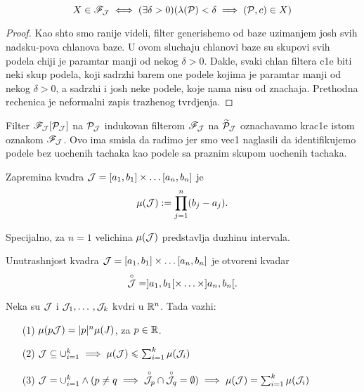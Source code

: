 \documentclass[../main.tex]{subfiles}
\begin{document}
    \begin{pr}
    	\[X \in \mathscr{F}_{\mathcal{J}} \iff (\exists \delta > 0) (\lambda(\mathcal{P})<\delta \implies (\mathcal{P},c)\in X)\]
    \end{pr}

    \begin{proof}
    	Kao shto smo ranije videli, filter generishemo od baze uzimanjem josh svih nadsku-pova chlanova baze. U ovom sluchaju chlanovi baze su skupovi svih podela
	chiji je paramtar manji od nekog $\delta>0$. Dakle, svaki chlan filtera c1e biti neki skup podela, koji sadrzhi barem one podele kojima je paramtar
	manji od nekog $\delta>0$, a sadrzhi i josh neke podele, koje nama nisu od znachaja. Prethodna rechenica je neformalni zapis trazhenog tvrdjenja.
    \end{proof}

    Filter $\mathscr{F}_{\mathcal{J}}[\mathcal{P}_{\mathcal{J}}]$ na $\mathcal{P}_{\mathcal{J}}$ indukovan filterom $\mathscr{F}_{\mathcal{J}}$ na $\widetilde{\mathcal{P}}_{\mathcal{J}}$ oznachavamo krac1e istom oznakom $\mathscr{F}_{\mathcal{J}}$. Ovo ima smisla da radimo jer
    smo vec1 naglasili da identifikujemo podele bez uochenih tachaka kao podele sa praznim skupom uochenih tachaka.

    \begin{de}
    	Zapremina kvadra $\mathcal{J}=[a_1,b_1]\times \dotso [a_n,b_n]$ je \[\mu(\mathcal{J}):=\prod_{j=1}^n(b_j-a_j).\]
    \end{de}

    Specijalno, za $n=1$ velichina $\mu(\mathcal{J})$ predstavlja duzhinu intervala.

    \begin{de}
    	Unutrashnjost kvadra $\mathcal{J} = [a_1,b_1]\times \dotso [a_n,b_n]$ je otvoreni kvadar $$\overset{\circ}{\mathcal{J}} = ]a_1,b_1[\times \dotso \times ]a_n,b_n[.$$
    \end{de}

    \begin{tvr}
    	Neka su $\mathcal{J}$ i $\mathcal{J}_1,\dotso,\mathcal{J}_k$ kvdri u $\mathbb{R}^n$. Tada vazhi: 
	\begin{itemize}
	    \item[(1)] $\mu(p\mathcal{J})=|p|^n\mu(J)$, za $p \in \mathbb{R}$. 
	    \item[(2)] $\mathcal{J} \subseteq \cup_{i=1}^k \implies \mu(\mathcal{J}) \leqslant \sum_{i=1}^k \mu(\mathcal{J}_i)$
	    \item[(3)] $\mathcal{J}=\cup_{i=1}^k \land ( p \neq q \implies \overset{\circ}{\mathcal{J}_p} \cap \overset{\circ}{\mathcal{J}_q} = \emptyset) \implies \mu(\mathcal{J}) = \sum_{i=1}^k \mu(\mathcal{J}_i)$
	\end{itemize}
    \end{tvr}
\end{document}
